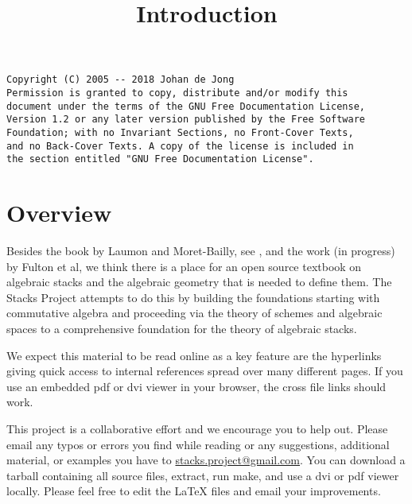 

%


\title{Introduction}


\maketitle

\label{section-phantom}

\begin{verbatim}
Copyright (C) 2005 -- 2018 Johan de Jong
Permission is granted to copy, distribute and/or modify this
document under the terms of the GNU Free Documentation License,
Version 1.2 or any later version published by the Free Software
Foundation; with no Invariant Sections, no Front-Cover Texts,
and no Back-Cover Texts. A copy of the license is included in
the section entitled "GNU Free Documentation License".
\end{verbatim}

\tableofcontents


\section{Overview}
\label{section-overview}

\noindent
Besides the book by Laumon and Moret-Bailly, see \cite{LM-B}, and the work
(in progress) by Fulton et al, we think there is a place for an open source
textbook on algebraic stacks and the algebraic geometry that is needed
to define them. The Stacks Project attempts to do this by building the
foundations starting with commutative algebra and proceeding via the
theory of schemes and algebraic spaces to a comprehensive foundation for
the theory of algebraic stacks.

\medskip\noindent
We expect this material to be read online as a key feature are the hyperlinks
giving quick access to internal references spread over many different pages.
If you use an embedded pdf or dvi viewer in your browser, the cross file
links should work.

\medskip\noindent
This project is a collaborative effort and we encourage you to help out.
Please email any typos or errors you find while reading or
any suggestions, additional material, or examples you have to
\href{mailto:stacks.project@gmail.com}{stacks.project@gmail.com}.
You can download a tarball containing all source files, extract,
run make, and use a dvi or pdf viewer locally. Please feel free to
edit the LaTeX files and email your improvements.


